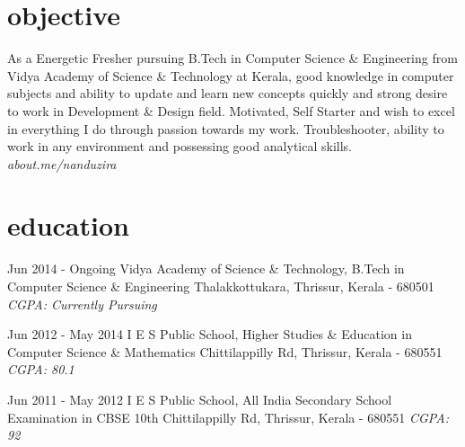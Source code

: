 \documentclass[]{friggeri-cv}
\begin{document}
\newline
\newline
\newline

\section{objective}
\begin{entrylist}

	\entry
	{}
    {{\normalfont As a} Energetic Fresher {\normalfont pursuing B.Tech in} Computer Science \& Engineering {\normalfont from} Vidya Academy of Science \& Technology {\normalfont at Kerala, good knowledge in computer subjects and ability to update and learn new concepts quickly and strong desire to work in} Development \& Design field. {\normalfont Motivated, Self Starter and wish to excel in everything I do through passion towards my work. Troubleshooter, ability to work in any environment and possessing  good analytical skills.}}
    {\emph{about.me/nanduzira}}
	{}
\end{entrylist}
\newline

\section{education}
\begin{entrylist}
	
	\entry
	{Jun 2014 - Ongoing}
	{Vidya Academy of Science \& Technology, {\normalfont B.Tech in Computer Science \& Engineering \newline}}
	{Thalakkottukara, Thrissur, Kerala - 680501}
	{\emph{CGPA: Currently Pursuing}}
	  
	
	\entry
	{Jun 2012 - May 2014}
	{I E S Public School, {\normalfont Higher Studies \& Education in Computer Science \& Mathematics \newline}}
	{Chittilappilly Rd, Thrissur, Kerala - 680551}
	{\emph{CGPA: 80.1}}
    
    
	\entry
	{Jun 2011 - May 2012}
	{I E S Public School, {\normalfont All India Secondary School Examination in CBSE 10th \newline }}
	{Chittilappilly Rd, Thrissur, Kerala - 680551}
	{\emph{CGPA: 92}}
	  
\end{entrylist}
\newline
\end{document}
